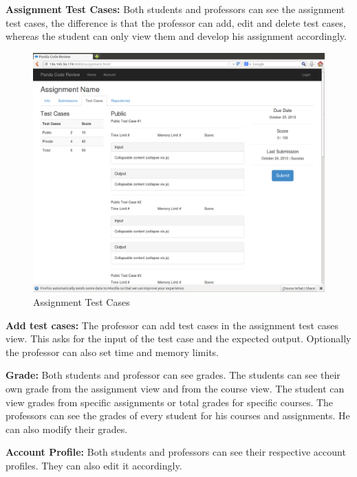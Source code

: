 \textbf{Assignment Test Cases:} Both students and professors can see the
assignment test cases, the difference is that the professor can add, edit and
delete test cases, whereas the student can only view them and develop his
assignment accordingly.

\begin{figure}[H]
	\centering
	\includegraphics[width=\textwidth]{img/assignment-test}
	\caption{Assignment Test Cases}
\end{figure}

\textbf{Add test cases:} The professor can add test cases in the
assignment test cases view. This asks for the input of the test case and the
expected output. Optionally the professor can also set time and memory limits.

\textbf{Grade:} Both students and professor can see grades. The students
can see their own grade from the assignment view and from the course view. The
student can view grades from specific assignments or total grades for
specific courses. The professors can see the grades of every student for his
courses and assignments. He can also modify their grades.

\textbf{Account Profile:} Both students and professors can see
their respective account profiles. They can also edit it accordingly.


